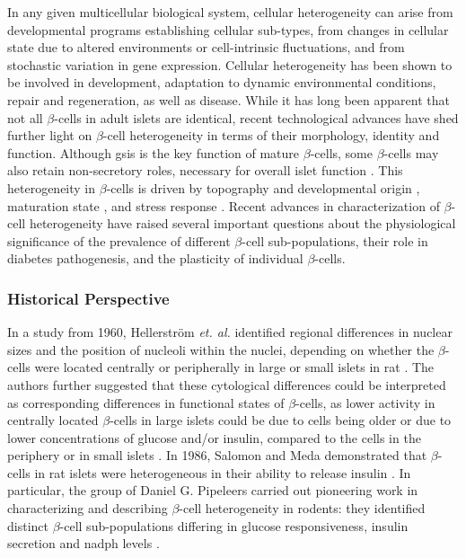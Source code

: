 In any given multicellular biological system, cellular heterogeneity  can arise from developmental programs establishing cellular sub-types, from changes in cellular state due to altered environments or cell-intrinsic fluctuations, and from stochastic variation in gene expression. Cellular heterogeneity has been shown to be involved in development, adaptation to dynamic environmental conditions, repair and regeneration, as well as disease.
While it has long been apparent that not all $\beta$-cells in adult islets are identical, recent technological advances have shed further light on $\beta$-cell heterogeneity in terms of their morphology, identity and function. Although \gls{gsis} is the key function of mature $\beta$-cells, some $\beta$-cells may also retain non-secretory roles, necessary for overall islet function \textbf{\cite{liu_all_2017}}. This heterogeneity in $\beta$-cells is driven by topography and developmental origin \textbf{\cite{puri_plasticity_2015,roscioni_impact_2016}}, maturation state \textbf{\cite{salinno_-cell_2019}}, and stress response \textbf{\cite{xin_pseudotime_2018}}. Recent advances in characterization of $\beta$-cell heterogeneity have raised several important questions about the physiological significance of the prevalence of different $\beta$-cell sub-populations, their role in diabetes pathogenesis, and the plasticity of individual $\beta$-cells.

\subsubsection{Historical Perspective}
In a study from 1960, Hellerström \textit{et. al.} identified regional differences in nuclear sizes and the position of nucleoli within the nuclei, depending on whether the $\beta$-cells were located centrally or peripherally in large or small islets in rat \textbf{\cite{hellerstrom_properties_1960}}. The authors further suggested that these cytological differences could be interpreted as corresponding differences in functional states of $\beta$-cells, as lower activity in centrally located $\beta$-cells in large islets could be due to cells being older or due to lower concentrations of glucose and/or insulin, compared to the cells in the periphery or in small islets \textbf{\cite{hellerstrom_properties_1960}}. In 1986, Salomon and Meda demonstrated that $\beta$-cells in rat islets were heterogeneous in their ability to release insulin \textbf{\cite{salomon_heterogeneity_1986}}. In particular, the group of Daniel G. Pipeleers carried out pioneering work in characterizing and describing $\beta$-cell heterogeneity in rodents: they identified distinct $\beta$-cell sub-populations differing in glucose responsiveness, insulin secretion and \gls{nadph} levels \textbf{\cite{kiekens_differences_1992,schuit_glucose_1988,van_de_winkel_autofluorescence-activated_1983}}.\\

